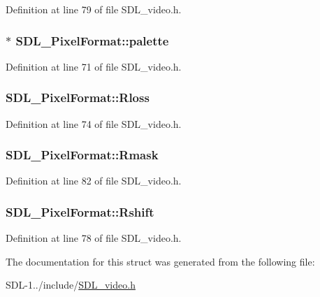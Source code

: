 Definition at line 79 of file S\+D\+L\+\_\+video.\+h.

\hypertarget{struct_s_d_l___pixel_format_aeae611aba76f5eb11b696807926c5116}{}
\subsubsection[{palette}]{$\ast$ S\+D\+L\+\_\+\+Pixel\+Format\+::palette}\label{struct_s_d_l___pixel_format_aeae611aba76f5eb11b696807926c5116}


Definition at line 71 of file S\+D\+L\+\_\+video.\+h.

\hypertarget{struct_s_d_l___pixel_format_a9994b4ed87a2551253aebfa191db8424}{}
\subsubsection[{Rloss}]{ S\+D\+L\+\_\+\+Pixel\+Format\+::\+Rloss}\label{struct_s_d_l___pixel_format_a9994b4ed87a2551253aebfa191db8424}


Definition at line 74 of file S\+D\+L\+\_\+video.\+h.

\hypertarget{struct_s_d_l___pixel_format_a35e5793f6e9c356aec2d130167174946}{}
\subsubsection[{Rmask}]{ S\+D\+L\+\_\+\+Pixel\+Format\+::\+Rmask}\label{struct_s_d_l___pixel_format_a35e5793f6e9c356aec2d130167174946}


Definition at line 82 of file S\+D\+L\+\_\+video.\+h.

\hypertarget{struct_s_d_l___pixel_format_abfdec7b9ee2ee39db630f4022e4e0daa}{}
\subsubsection[{Rshift}]{ S\+D\+L\+\_\+\+Pixel\+Format\+::\+Rshift}\label{struct_s_d_l___pixel_format_abfdec7b9ee2ee39db630f4022e4e0daa}


Definition at line 78 of file S\+D\+L\+\_\+video.\+h.



The documentation for this struct was generated from the following file\+:\begin{DoxyCompactItemize}
\item 
S\+D\+L-\/1../include/\hyperlink{_s_d_l__video_8h}{S\+D\+L\+\_\+video.\+h}\end{DoxyCompactItemize}
